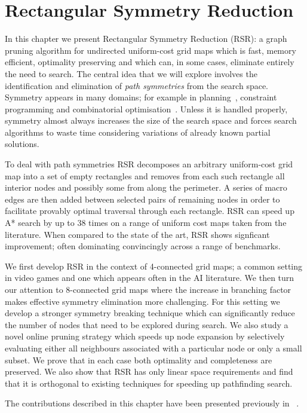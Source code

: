 \chapter{Rectangular Symmetry Reduction}
\label{cha:rsr}
In this chapter we present Rectangular Symmetry Reduction (RSR): a graph pruning
algorithm for undirected uniform-cost grid maps which is fast, memory efficient,
optimality preserving and which can, in some cases, eliminate entirely the need
to search.  The central idea that we will explore involves the identification
and elimination of \emph{path symmetries} from the search space. 
Symmetry appears in many domains; for example in planning~\cite{fox99}, constraint 
programming \cite{walsh07} and combinatorial optimisation~\cite{fukunaga08}. 
Unless it is handled properly, symmetry almost always 
increases the size of the search space and forces search algorithms to waste time
considering variations of already known partial solutions.
\par
To deal with path symmetries RSR decomposes an arbitrary uniform-cost grid map
into a set of empty rectangles and removes from each such
rectangle all interior nodes and possibly some from along the perimeter.  A
series of macro edges are then added between selected pairs of remaining nodes
in order to facilitate provably optimal traversal through each rectangle.  
RSR can speed up A* search by up to 38 times on a range of uniform cost maps taken 
from the literature.  When compared to the state of the art, RSR shows signficant 
improvement; often dominating convincingly across a range of benchmarks.
\par
We first develop RSR in the context of 4-connected grid maps; a common
setting in video games and one which appears often in the AI literature.
We then turn our attention to 8-connected grid maps where the increase in
branching factor makes effective symmetry elimination more challenging. 
For this setting we develop a stronger symmetry breaking technique which can significantly
reduce the number of nodes that need to be explored during search. We also study a novel 
online pruning strategy which speeds up node expansion by selectively evaluating either 
all neighbours associated with a particular node or only a small subset.  
We prove that in each case both optimality and completeness are preserved. We also
show that RSR has only linear space requirements and find that it is orthogonal
to existing techniques for speeding up pathfinding search.

The contributions described in this chapter have been presented previously in
~\cite{harabor10,harabor11a,harabor11c}.

